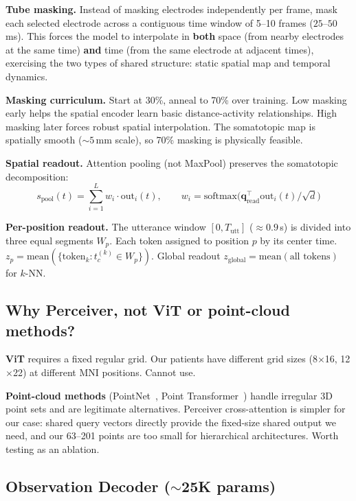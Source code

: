 \documentclass[11pt,letterpaper]{article}
\begin{document}
\textbf{Tube masking.} Instead of masking electrodes independently per frame, mask each selected electrode across a contiguous time window of 5--10 frames ($25$--$50$\,ms). This forces the model to interpolate in \textbf{both} space (from nearby electrodes at the same time) \textbf{and} time (from the same electrode at adjacent times), exercising the two types of shared structure: static spatial map and temporal dynamics.

\textbf{Masking curriculum.} Start at 30\%, anneal to 70\% over training. Low masking early helps the spatial encoder learn basic distance-activity relationships. High masking later forces robust spatial interpolation. The somatotopic map is spatially smooth (${\sim}5$\,mm scale), so 70\% masking is physically feasible.

\textbf{Spatial readout.} Attention pooling (not MaxPool) preserves the somatotopic decomposition:
\begin{equation}
s_{\text{pool}}(t) = \sum_{i=1}^{L} w_i \cdot \text{out}_i(t), \qquad w_i = \text{softmax}\bigl(\mathbf{q}_{\text{read}}^\top \text{out}_i(t) / \sqrt{d}\bigr)
\end{equation}

\textbf{Per-position readout.} The utterance window $[0, T_{\text{utt}}]$ (${\approx}0.9$\,s) is divided into three equal segments $W_p$. Each token assigned to position $p$ by its center time. $z_p = \text{mean}(\{\text{token}_k : t_c^{(k)} \in W_p\})$. Global readout $z_{\text{global}} = \text{mean}(\text{all tokens})$ for $k$-NN.


\subsection{Why Perceiver, not ViT or point-cloud methods?}

\textbf{ViT} requires a fixed regular grid. Our patients have different grid sizes (8$\times$16, 12$\times$22) at different MNI positions. Cannot use.

\textbf{Point-cloud methods} (PointNet~\cite{qi2017}, Point Transformer~\cite{zhao2021}) handle irregular 3D point sets and are legitimate alternatives. Perceiver cross-attention is simpler for our case: shared query vectors directly provide the fixed-size shared output we need, and our 63--201 points are too small for hierarchical architectures. Worth testing as an ablation.


\subsection{Observation Decoder (${\sim}$25K params)}\label{sec:obs-decoder}
\end{document}
